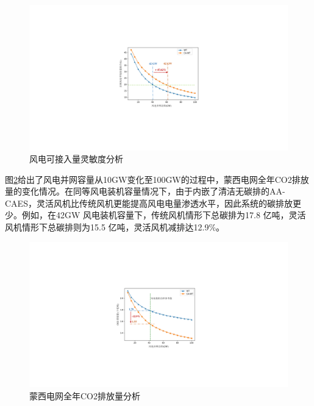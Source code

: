 \begin{figure}[H] %
  \centering
  \includegraphics[scale=0.91]{figures/Chap5-14-MengXi-PowerCapacity.pdf}
  \caption{风电可接入量灵敏度分析}
  \label{fig:MengXi-PowerCapacity}
\end{figure}

图\ref{fig:MengXi-CO2}给出了风电并网容量从10GW变化至100GW的过程中，蒙西电网全年CO2排放量的变化情况。在同等风电装机容量情况下，由于内嵌了清洁无碳排的AA-CAES，灵活风机比传统风机更能提高风电电量渗透水平，因此系统的碳排放更少。例如，在42GW 风电装机容量下，传统风机情形下总碳排为17.8 亿吨，灵活风机情形下总碳排则为15.5 亿吨，灵活风机减排达12.9\%。

\begin{figure}[H] %
  \centering
  \includegraphics[scale=0.93]{figures/Chap5-14-MengXi-CO2.pdf}
  \caption{蒙西电网全年CO2排放量分析}
  \label{fig:MengXi-CO2}
\end{figure}

